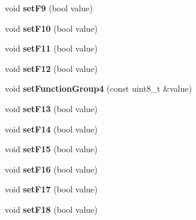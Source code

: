 \begin{DoxyCompactItemize}
\item 
\mbox{\label{classTBT_1_1LocDecoder_a725b9d78cbdbd1e60a9102ddf5b8aaf3}} 
void {\bfseries set\+F9} (bool value)
\item 
\mbox{\label{classTBT_1_1LocDecoder_a9976487964f6167d2d5e084d4ed787b7}} 
void {\bfseries set\+F10} (bool value)
\item 
\mbox{\label{classTBT_1_1LocDecoder_aa732b54dfa7d535cec4aaab105f4c64d}} 
void {\bfseries set\+F11} (bool value)
\item 
\mbox{\label{classTBT_1_1LocDecoder_a8b7c59df79fb92011db6e5e5999ffd28}} 
void {\bfseries set\+F12} (bool value)
\item 
\mbox{\label{classTBT_1_1LocDecoder_a5b7c569ddccfe68faef7136bf27fadb8}} 
void {\bfseries set\+Function\+Group4} (const uint8\+\_\+t \&value)
\item 
\mbox{\label{classTBT_1_1LocDecoder_a90966aa043e13a5f2a8c4f4019c662c9}} 
void {\bfseries set\+F13} (bool value)
\item 
\mbox{\label{classTBT_1_1LocDecoder_a4d74e6b1232f3c716bf624dc1681164a}} 
void {\bfseries set\+F14} (bool value)
\item 
\mbox{\label{classTBT_1_1LocDecoder_aee5779bd1917c16099c77b3d57aedbb8}} 
void {\bfseries set\+F15} (bool value)
\item 
\mbox{\label{classTBT_1_1LocDecoder_a0a1a0f36dbe6b3c0c50eda41eb7b673e}} 
void {\bfseries set\+F16} (bool value)
\item 
\mbox{\label{classTBT_1_1LocDecoder_ad1355610f7158630e75af3df1e4d01c4}} 
void {\bfseries set\+F17} (bool value)
\item 
\mbox{\label{classTBT_1_1LocDecoder_aae4349cafcf17f8530ce151507bf3cf3}} 
void {\bfseries set\+F18} (bool value)
\item 
\mbox{\label{classTBT_1_1LocDecoder_a4625176dfddd8495f7a11be4b9dd29bf}} 

\end{DoxyCompactItemize}
